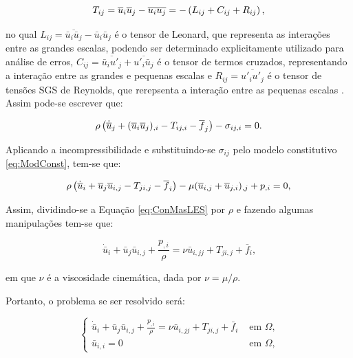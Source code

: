 \begin{equation}
    T_{ij}=\overline{u}_i\overline{u}_j-\overline{u_iu_j}=-\left({L_{ij}+C_{ij}+R_{ij}}\right)\text{,}
\end{equation}

\noindent no qual $L_{ij}=\overline{\bar{u}_i\bar{u}_j}-\bar{u}_i\bar{u}_j$ é o tensor de Leonard, que representa as interações entre as grandes escalas, podendo ser determinado explicitamente utilizado para análise de erros, $C_{ij}=\overline{\bar{u}_iu'_j}+\overline{u'_i\bar{u}_j}$ é o tensor de termos cruzados, representando a interação entre as grandes e pequenas escalas e $R_{ij}=\overline{u'_iu'_j}$ é o tensor de tensões SGS de Reynolds, que rerepsenta a interação entre as pequenas escalas \cite{piomelli1999large}. Assim pode-se escrever que:

\begin{equation}
    \rho\left({\dot{\overline{u}}_j+(\overline{u}_i\overline{u}_j)_{,i}-T_{ij,i}-\overline{f}_j}\right)-\sigma_{ij,i}=0\text{.}
\end{equation}

Aplicando a incompressibilidade e substituindo-se $\sigma_{ij}$ pelo modelo constitutivo \ref{eq:ModConst}, tem-se que:

\begin{equation}
    \rho\left({\dot{\overline{u}}_i+\overline{u}_j\overline{u}_{i,j}-T_{ji,j}-\overline{f}_i}\right)-\mu(\overline{u}_{i,j}+\overline{u}_{j,i})_{,j}+p_{,i}=0\text{,}\label{eq:ConMasLES}
\end{equation}

\noindent Assim, dividindo-se a Equação \ref{eq:ConMasLES} por $\rho$ e fazendo algumas manipulações tem-se que:

\begin{equation}
    \dot{\bar{u}}_i+\bar{u}_j\bar{u}_{i,j}+\frac{p_{,i}}{\rho}=\nu\bar{u}_{i,jj}+T_{ji,j}+\bar{f}_i\text{,}
\end{equation}

\noindent em que $\nu$ é a viscosidade cinemática, dada por $\nu=\mu/\rho$.

Portanto, o problema se ser resolvido será:

\begin{equation}
    \left\{
    \begin{array}{ll}
        \dot{\bar{u}}_i+\bar{u}_j\bar{u}_{i,j}+\frac{p_{,i}}{\rho}=\nu\bar{u}_{i,jj}+T_{ji,j}+\bar{f}_i & \text{ em }\Omega\text{,} \\
        \bar{u}_{i,i}=0                                                                                 & \text{ em }\Omega\text{,}
    \end{array}
    \right.
\end{equation}

